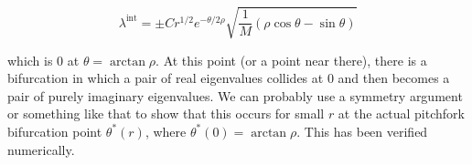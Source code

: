 \documentclass[12pt]{article}
\begin{document}
\[
\lambda^{\text{int}} = \pm C r^{1/2} e^{-\theta/2\rho} \sqrt{ \frac{1}{M} \left( \rho \cos \theta - \sin \theta \right) }
\]

which is 0 at $\theta = \arctan \rho$. At this point (or a point near there), there is a bifurcation in which a pair of real eigenvalues collides at 0 and then becomes a pair of purely imaginary eigenvalues. We can probably use a symmetry argument or something like that to show that this occurs for small $r$ at the actual pitchfork bifurcation point $\theta^*(r)$, where $\theta^*(0) = \arctan \rho$. This has been verified numerically.









\end{document}
